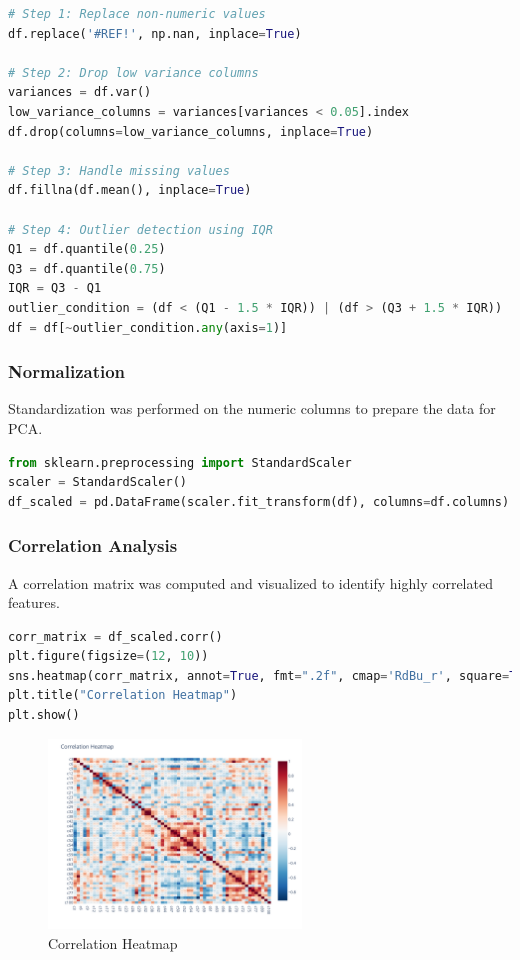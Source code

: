 \begin{lstlisting}[language=Python]
# Step 1: Replace non-numeric values
df.replace('#REF!', np.nan, inplace=True)

# Step 2: Drop low variance columns
variances = df.var()
low_variance_columns = variances[variances < 0.05].index
df.drop(columns=low_variance_columns, inplace=True)

# Step 3: Handle missing values
df.fillna(df.mean(), inplace=True)

# Step 4: Outlier detection using IQR
Q1 = df.quantile(0.25)
Q3 = df.quantile(0.75)
IQR = Q3 - Q1
outlier_condition = (df < (Q1 - 1.5 * IQR)) | (df > (Q3 + 1.5 * IQR))
df = df[~outlier_condition.any(axis=1)]
\end{lstlisting}

\subsubsection{Normalization}
Standardization was performed on the numeric columns to prepare the data for PCA.

\begin{lstlisting}[language=Python]
from sklearn.preprocessing import StandardScaler
scaler = StandardScaler()
df_scaled = pd.DataFrame(scaler.fit_transform(df), columns=df.columns)
\end{lstlisting}

\subsubsection{Correlation Analysis}
A correlation matrix was computed and visualized to identify highly correlated features.

\begin{lstlisting}[language=Python]
corr_matrix = df_scaled.corr()
plt.figure(figsize=(12, 10))
sns.heatmap(corr_matrix, annot=True, fmt=".2f", cmap='RdBu_r', square=True)
plt.title("Correlation Heatmap")
plt.show()
\end{lstlisting}

\begin{figure}[H]
    \centering
    \includegraphics[width=0.6\textwidth]{Images/correlation_heatmap.png}
    \caption{Correlation Heatmap}
\end{figure}


